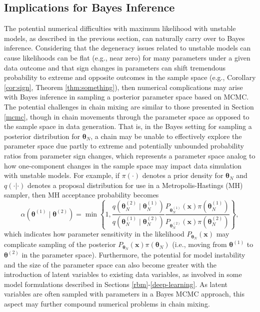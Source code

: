 \documentclass[numbib]{imamat}
\theoremstyle{theorem}
\theoremstyle{lemma}
\theoremstyle{example}
\theoremstyle{corollary}
\theoremstyle{definition}
\theoremstyle{remark}
\theoremstyle{approximation}
\theoremstyle{scheme}
\newcommand{\ak}[1]{{\color{blue} #1}}
\begin{document}
\hypertarget{bayes}{%
\subsection{Implications for Bayes Inference}\label{bayes}}

The potential numerical difficulties with maximum likelihood with unstable models, as described in the previous section, can naturally carry over to Bayes inference. Considering that the degeneracy issues related to unstable models can cause likelihoods can be flat (e.g., near zero) for many parameters under a given data outcome and that sign changes in parameters can shift tremendous probability to extreme and opposite outcomes in the sample space (e.g., Corollary \ref{cor:sign}, Theorem \ref{thm:something}), then numerical complications may arise with Bayes inference in sampling a posterior parameter space based on MCMC. The potential challenges in chain mixing are similar to those presented in Section \ref{mcmc}, though in chain movements through the parameter space as opposed to the sample space in data generation. That is, in the Bayes setting for sampling a posterior distribution for \(\boldsymbol \theta_N\), a chain may \ak{be unable} to effectively explore the parameter space due partly to extreme and potentially unbounded probability ratios from parameter sign changes, which represents a parameter space analog to how one-component changes in the sample space may impact data simulation with unstable models. For example, if \(\pi(\cdot)\) denotes a prior density for \(\boldsymbol \theta_N\) and \(q(\cdot | \cdot)\) denotes a proposal distribution for use in a Metropolis-Hastings (MH) sampler, then MH acceptance probability becomes
\[
\alpha\left(\boldsymbol \theta^{(1)} \mid \boldsymbol \theta^{(2)}\right)= \min\left\{1,
\frac{q(\boldsymbol \theta_N^{(2)} \mid \boldsymbol \theta_N^{(1)})}{q(\boldsymbol \theta_N^{(1)} \mid \boldsymbol \theta_N^{(2)})}
\frac{P_{\boldsymbol \theta_N^{(1)}} ( \boldsymbol x ) \pi(\boldsymbol \theta_N^{(1)}) }{P_{\boldsymbol \theta^{(2)}_N} (  \boldsymbol x) \pi(\boldsymbol \theta_N^{(2)}) } \right\},
\]
which indicates how parameter sensitivity in the likelihood \(P_{\boldsymbol \theta_N} ( \boldsymbol x)\) may complicate sampling of the posterior \(P_{\boldsymbol \theta_N} ( \boldsymbol x) \pi(\boldsymbol \theta_N)\) (i.e., moving from \(\boldsymbol \theta^{(1)}\) to \(\boldsymbol \theta^{(2)}\) in the parameter space). Furthermore, the potential for model instability and the size of the parameter space can also become greater with the introduction of latent variables to existing data variables, as involved in some model formulations described in Sections \ref{rbm}-\ref{deep-learning}. As latent variables are often sampled with parameters in a Bayes MCMC approach, this aspect may further compound numerical problems in chain mixing.
\end{document}
